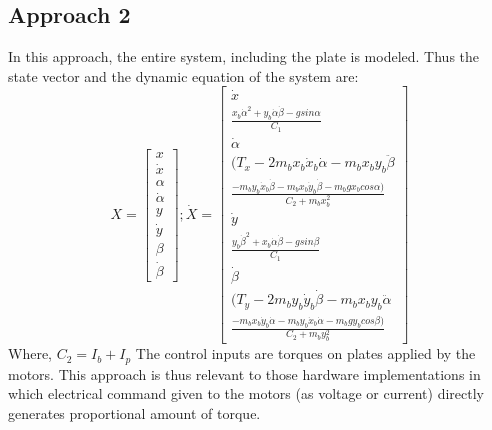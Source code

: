 \documentclass[conference]{IEEEtran}
\begin{document}
\subsection*{Approach 2 }
In this approach, the entire system, including the plate is modeled. Thus the state vector and the dynamic equation of the system are: 
\begin{equation}
X = \begin{bmatrix}
x \\ \dot x \\ \alpha \\ \dot \alpha \\ y \\ \dot y \\ \beta \\ \dot \beta
\end{bmatrix}
;
\dot X = 
\begin{bmatrix}
\dot x 
\\ \frac{x_{b} \dot \alpha^{2} + y_{b} \dot \alpha \dot \beta - gsin\alpha}{C_{1}} 
\\ \dot \alpha
\\  ( T_{x} - 2m_{b}x_{b}\dot x_{b} \dot \alpha - m_{b}x_{b} y_{b} \ddot \beta
\\  \frac{- m_{b}y_{b}\dot x_{b} \dot \beta - m_{b}x_{b}\dot y_{b} \dot \beta - m_{b}gx_{b}cos\alpha )}{C_{2} + m_{b}x_{b}^{2}}
\\ \dot y 
\\ \frac{y_{b} \dot \beta^{2} + x_{b} \dot \alpha \dot \beta - gsin\beta}{C_{1}}
\\ \dot \beta
\\ ( T_{y} - 2m_{b}y_{b}\dot y_{b} \dot \beta - m_{b}x_{b} y_{b} \ddot \alpha
\\ \frac{- m_{b}x_{b}\dot y_{b} \dot \alpha - m_{b}y_{b}\dot x_{b} \dot \alpha - m_{b}gy_{b}cos\beta )}{C_{2} + m_{b}y_{b}^{2}}
\end{bmatrix}\label{eq14}
\end{equation}
Where, $C_{2} = I_{b} + I_{p}$
The control inputs are torques on plates applied by the motors. This approach is thus relevant to those hardware implementations in which electrical command given to the motors (as voltage or current) directly generates proportional amount of torque.
\end{document}

